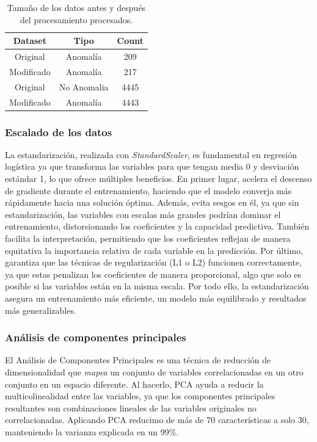 \documentclass[12pt,letterpaper]{article}
\begin{document}
\begin{table}[H]
    \centering
    \begin{tabular}{|c|c|c|}
    \hline
    Dataset & Tipo & Count  \\ \hline \hline
    Original & Anomalía & 209 \\ \hline
    Modificado & Anomalía &  217 \\ \hline
    Original & No Anomalia & 4445 \\ \hline
    Modificado & Anomalía &  4443 \\ \hline
    \end{tabular}
    \caption{Tamaño de los datos antes y después del procesamiento procesados.}
    \label{tab:Reduccion_ruido}
\end{table}

\subsubsection{Escalado de los datos}

 La estandarización, realizada con \textit{StandardScaler}, es fundamental en regresión logística ya que transforma las variables para que tengan media 0 y desviación estándar 1, lo que ofrece múltiples beneficios. En primer lugar, acelera el descenso de gradiente durante el entrenamiento, haciendo que el modelo converja más rápidamente hacia una solución óptima. Además, evita sesgos en él, ya que sin estandarización, las variables con escalas más grandes podrían dominar el entrenamiento, distorsionando los coeficientes y la capacidad predictiva. También facilita la interpretación, permitiendo que los coeficientes reflejan de manera equitativa la importancia relativa de cada variable en la predicción. Por último, garantiza que las técnicas de regularización (L1 o L2) funcionen correctamente, ya que estas penalizan los coeficientes de manera proporcional, algo que solo es posible si las variables están en la misma escala. Por todo ello, la estandarización asegura un entrenamiento más eficiente, un modelo más equilibrado y resultados más generalizables.

\subsubsection{Análisis de componentes principales}

El Análisis de Componentes Principales es una técnica de reducción de dimensionalidad que \textit{mapea} un conjunto de variables correlacionadas en un otro conjunto en un espacio diferente. Al hacerlo, PCA ayuda a reducir la multicolinealidad entre las variables, ya que los componentes principales resultantes son combinaciones lineales de las variables originales no correlacionadas. Aplicando PCA reducimo de más de 70 características a solo 30, manteniendo la varianza explicada en un 99\%.
\end{document}
